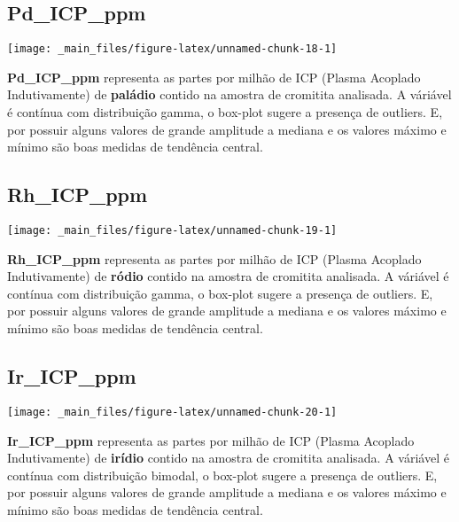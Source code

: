 \documentclass[
]{article}
\begin{document}
\hypertarget{pd_icp_ppm}{%
\subsection{Pd\_ICP\_ppm}\label{pd_icp_ppm}}

\begin{center}\texttt{[image: \_main\_files/figure-latex/unnamed-chunk-18-1]} \end{center}

\textbf{Pd\_ICP\_ppm} representa as partes por milhão de ICP (Plasma Acoplado Indutivamente) de \textbf{paládio} contido na amostra de cromitita analisada. A váriável é contínua com distribuição gamma, o box-plot sugere a presença de outliers. E, por possuir alguns valores de grande amplitude a mediana e os valores máximo e mínimo são boas medidas de tendência central.

\hypertarget{rh_icp_ppm}{%
\subsection{Rh\_ICP\_ppm}\label{rh_icp_ppm}}

\begin{center}\texttt{[image: \_main\_files/figure-latex/unnamed-chunk-19-1]} \end{center}

\textbf{Rh\_ICP\_ppm} representa as partes por milhão de ICP (Plasma Acoplado Indutivamente) de \textbf{ródio} contido na amostra de cromitita analisada. A váriável é contínua com distribuição gamma, o box-plot sugere a presença de outliers. E, por possuir alguns valores de grande amplitude a mediana e os valores máximo e mínimo são boas medidas de tendência central.

\hypertarget{ir_icp_ppm}{%
\subsection{Ir\_ICP\_ppm}\label{ir_icp_ppm}}

\begin{center}\texttt{[image: \_main\_files/figure-latex/unnamed-chunk-20-1]} \end{center}

\textbf{Ir\_ICP\_ppm} representa as partes por milhão de ICP (Plasma Acoplado Indutivamente) de \textbf{irídio} contido na amostra de cromitita analisada. A váriável é contínua com distribuição bimodal, o box-plot sugere a presença de outliers. E, por possuir alguns valores de grande amplitude a mediana e os valores máximo e mínimo são boas medidas de tendência central.
\end{document}
